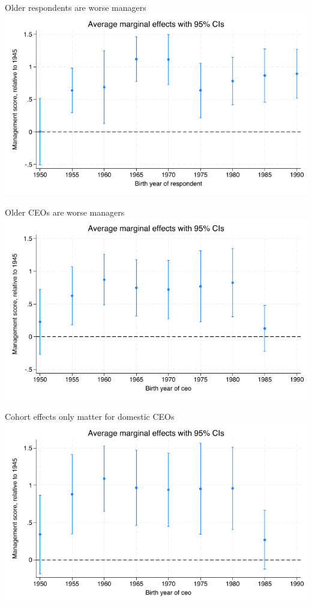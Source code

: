 \documentclass[
  ignorenonframetext,
  aspectratio=1610,
]{beamer}
\begin{document}
\begin{frame}{Older respondents are worse managers}
\protect\hypertarget{older-respondents-are-worse-managers}{}
\includegraphics{fig/cohort-respondent-marginsplot.png}
\end{frame}

\begin{frame}{Older CEOs are worse managers}
\protect\hypertarget{older-ceos-are-worse-managers}{}
\includegraphics{fig/cohort-ceo-marginsplot.png}
\end{frame}

\begin{frame}{Cohort effects only matter for domestic CEOs}
\protect\hypertarget{cohort-effects-only-matter-for-domestic-ceos}{}
\includegraphics{fig/cohort-ceodomestic-marginsplot.png}
\end{frame}
\end{document}

